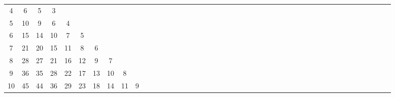 \documentclass[12pt,a4paper]{amsart}
\theoremstyle{definition} %
\theoremstyle{plain} %
\begin{document}
\begin{table}[h]
{\begin{tabular}{|c|*{44}{c|}}
             4 &   6 &   5 &   3 &     &     &     &     &     &     &     &     &     &     &     &     &     &     &     &     &     &     &     &     &     &     &     &     &    &    &    &    &             &             &             &             &             &             &             &             &             &             &             &             &             \\
             5 &  10 &   9 &   6 &   4 &     &     &     &     &     &     &     &     &     &     &     &     &     &     &     &     &     &     &     &     &     &     &     &    &    &    &    &             &             &             &             &             &             &             &             &             &             &             &             &             \\
             6 &  15 &  14 &  10 &   7 &   5 &     &     &     &     &     &     &     &     &     &     &     &     &     &     &     &     &     &     &     &     &     &     &    &    &    &    &             &             &             &             &             &             &             &             &             &             &             &             &             \\
             7 &  21 &  20 &  15 &  11 &   8 &   6 &     &     &     &     &     &     &     &     &     &     &     &     &     &     &     &     &     &     &     &     &     &    &    &    &    &             &             &             &             &             &             &             &             &             &             &             &             &             \\
             8 &  28 &  27 &  21 &  16 &  12 &   9 &   7 &     &     &     &     &     &     &     &     &     &     &     &     &     &     &     &     &     &     &     &     &    &    &    &    &             &             &             &             &             &             &             &             &             &             &             &             &             \\
             9 &  36 &  35 &  28 &  22 &  17 &  13 &  10 &   8 &     &     &     &     &     &     &     &     &     &     &     &     &     &     &     &     &     &     &     &    &    &    &    &             &             &             &             &             &             &             &             &             &             &             &             &             \\
            10 &  45 &  44 &  36 &  29 &  23 &  18 &  14 &  11 &   9 &     &     &     &     &     &     &     &     &     &     &     &     &     &     &     &     &     &     &    &    &    &    &             &             &             &             &             &             &             &             &             &             &             &             &             \\

\end{tabular}}
\end{table}
\end{document}
